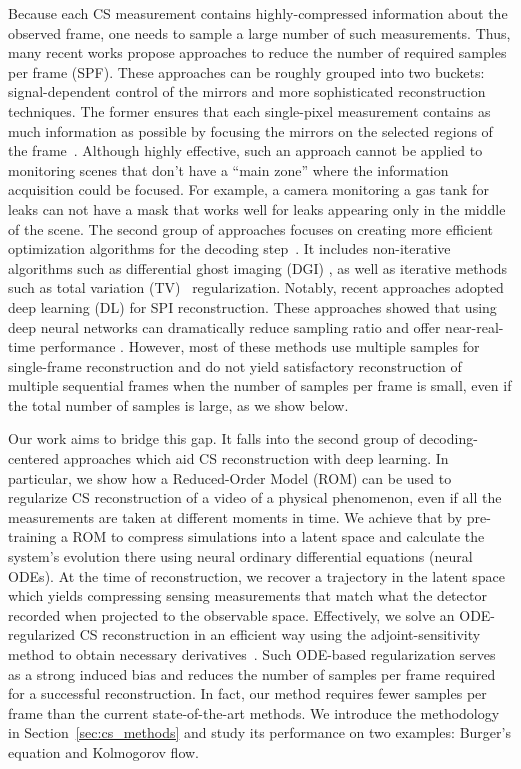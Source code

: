 Because each CS measurement contains highly-compressed information about the observed frame, one needs to sample a large number of such measurements. Thus, many recent works propose approaches to reduce the number of required samples per frame (SPF). These approaches can be roughly grouped into two buckets: signal-dependent control of the mirrors and more sophisticated reconstruction techniques. The former ensures that each single-pixel measurement contains as much information as possible by focusing the mirrors on the selected regions of the frame~\cite{zhang2017fast,sun2017russian,xu20181000}. Although highly effective, such an approach cannot be applied to monitoring scenes that don't have a ``main zone'' where the information acquisition could be focused. For example, a camera monitoring a gas tank for leaks can not have a mask that works well for leaks appearing only in the middle of the scene. The second group of approaches focuses on creating more efficient optimization algorithms for the decoding step~\cite{katz2009compressive}. It includes non-iterative algorithms such as differential ghost imaging (DGI) \cite{gong2010method}, as well as iterative methods such as total variation (TV)~\cite{suo2016signal} regularization. Notably, recent approaches adopted deep learning (DL) for SPI reconstruction. These approaches showed that using deep neural networks can dramatically reduce sampling ratio and offer near-real-time performance \cite{lyu2017deep,higham2018deep,wang2019learning,wang2022single}. However, most of these methods use multiple samples for single-frame reconstruction and do not yield satisfactory reconstruction of multiple sequential frames when the number of samples per frame is small, even if the total number of samples is large, as we show below.

Our work aims to bridge this gap. It falls into the second group of decoding-centered approaches which aid CS reconstruction with deep learning. In particular, we show how a Reduced-Order Model (ROM) can be used to regularize CS reconstruction of a video of a physical phenomenon, even if all the measurements are taken at different moments in time. We achieve that by pre-training a ROM to compress simulations into a latent space and calculate the system's evolution there using neural ordinary differential equations (neural ODEs). At the time of reconstruction, we recover a trajectory in the latent space which yields compressing sensing measurements that match what the detector recorded when projected to the observable space. Effectively, we solve an ODE-regularized CS reconstruction in an efficient way using the adjoint-sensitivity method to obtain necessary derivatives~\cite{chen2018neuralode}. Such ODE-based regularization serves as a strong induced bias and reduces the number of samples per frame required for a successful reconstruction. In fact, our method requires fewer samples per frame than the current state-of-the-art methods. We introduce the methodology in Section~\ref{sec:cs_methods} and study its performance on two examples: Burger's equation and Kolmogorov flow.

